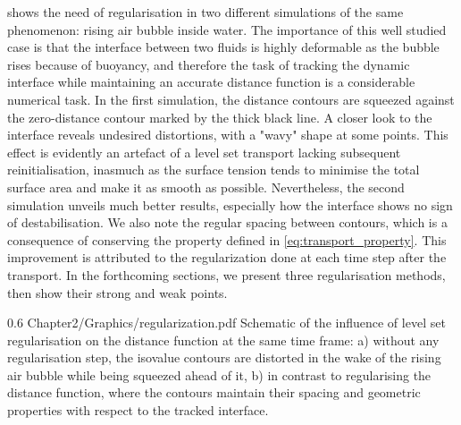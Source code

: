  shows the need of regularisation in two different 
simulations of the same phenomenon: rising air bubble inside
water. The importance of this well studied case \citep{sussman_level_1994,hysing_quantitative_2009}
is that the interface between two fluids is highly deformable
as the bubble rises because of buoyancy, and therefore the task of tracking the 
dynamic interface while maintaining an accurate distance function
is a considerable numerical task. In the first simulation, the distance contours 
are squeezed against the zero-distance contour marked by the 
thick black line. A closer look to the interface reveals undesired distortions, with a 
"wavy" shape at some points. This effect is evidently an artefact
of a level set transport lacking subsequent reinitialisation, inasmuch 
as the surface tension tends to minimise the total surface area and make it as smooth
as possible. Nevertheless, the second simulation unveils much better results, especially 
how the interface shows no sign of destabilisation. We also note the regular spacing between contours,
which is a consequence of conserving the property defined in \cref{eq:transport_property}.
This improvement is attributed to the regularization done at each time step after the transport.
In the forthcoming sections, we present three regularisation methods, then show their strong and weak points.
\begin{figureth}
{0.6}
{Chapter2/Graphics/regularization.pdf}
{Schematic of the influence of level set regularisation on the distance function at the same time frame: 
a) without any regularisation step, the isovalue contours are distorted in the wake of the rising air 
bubble while being squeezed ahead of it, 
b) in contrast to regularising the distance function, where the contours maintain their spacing and geometric 
properties with respect to the tracked interface.}
\label{fig:reinit_influence}
\end{figureth}
%
